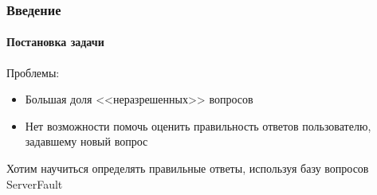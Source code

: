 \documentclass[10pt]{beamer}
\begin{document}
\begin{frame}
\frametitle{Введение}
\framesubtitle{Постановка задачи}

Проблемы:
\begin{itemize}
	\item Большая доля <<неразрешенных>> вопросов
	\item Нет возможности помочь оценить правильность ответов пользователю, задавшему новый вопрос
\end{itemize}

\vskip0.5cm

Хотим научиться определять правильные ответы, используя базу вопросов ServerFault

\end{frame}

\end{document}
